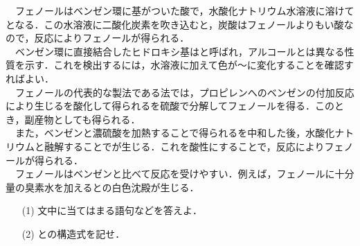 \documentclass[a4paper,12pt]{ltjsreport}
\begin{document}
\begin{que} 　フェノールはベンゼン環に基がついた酸で，水酸化ナトリウム水溶液に溶けてとなる．この水溶液に二酸化炭素を吹き込むと，炭酸はフェノールよりもい酸なので，反応によりフェノールが得られる．\\
 　ベンゼン環に直接結合したヒドロキシ基はと呼ばれ，アルコールとは異なる性質を示す．これを検出するには，水溶液に加えて色が〜に変化することを確認すればよい．\\
 　フェノールの代表的な製法である法では，プロピレンへのベンゼンの付加反応により生じるを酸化して得られるを硫酸で分解してフェノールを得る．このとき，副産物としても得られる．\\
 　また，ベンゼンと濃硫酸を加熱することで得られるを中和した後，水酸化ナトリウムと融解することでが生じる．これを酸性にすることで，反応によりフェノールが得られる．\\
　フェノールはベンゼンと比べて反応を受けやすい．例えば，フェノールに十分量の臭素水を加えるとの白色沈殿が生じる．
 \begin{itemize}
    \item [(1)]文中に当てはまる語句などを答えよ．
    \item [(2)]との構造式を記せ．
 \end{itemize}
\end{que}
\ans
\end{document}

